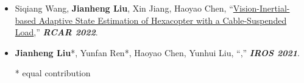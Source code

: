 \begin{itemize}
	\textbf{\emph{IROS 2022}}.\\
	\vspace{-8pt}
	\item Siqiang Wang, \textbf{Jianheng Liu}, Xin Jiang, Haoyao Chen, ``\href{https://ieeexplore.ieee.org/abstract/document/9872194}{Vision-Inertial-based Adaptive State Estimation of Hexacopter with a Cable-Suspended Load},''
	\textbf{\emph{RCAR 2022}}.\\
	\vspace{-8pt}
	\item \textbf{Jianheng Liu}*, Yunfan Ren*, Haoyao Chen, Yunhui Liu, ``,''
	\textbf{\emph{IROS 2021}}.\\
	\vspace{-8pt}

\footnotesize{* equal contribution}
\end{itemize}
